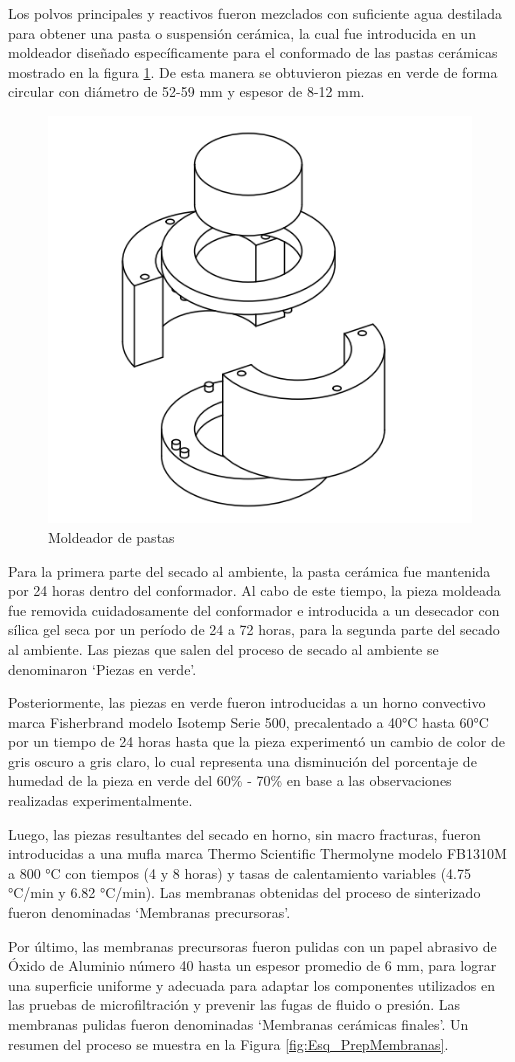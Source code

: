 \documentclass{article}
\begin{document}
Los polvos principales y reactivos fueron mezclados con suficiente 
agua destilada para obtener una pasta o suspensión cerámica, la cual 
fue introducida en un moldeador diseñado específicamente para el 
conformado de las pastas cerámicas mostrado en la 
figura \ref{fig:Moldeador_Pastas}. De esta manera se obtuvieron piezas 
en verde de forma circular con diámetro de 52-59 mm y 
espesor de 8-12 mm. 

\begin{figure}[ht]
    \centering
    \includegraphics[width=0.4\linewidth]{Graphics/Moldeador ZTMY-01.png}
    \caption{Moldeador de pastas}
    \label{fig:Moldeador_Pastas}
\end{figure}

Para la primera parte del secado al ambiente, la pasta cerámica fue 
mantenida por 24 horas dentro del conformador. 
Al cabo de este tiempo, la pieza moldeada fue removida 
cuidadosamente del conformador e introducida a un desecador con 
sílica gel seca por un período de 24 a 72 horas, para la segunda 
parte del secado al ambiente. Las piezas que salen del proceso de 
secado al ambiente se denominaron ‘Piezas en verde’.

Posteriormente, las piezas en verde fueron introducidas a un horno 
convectivo marca Fisherbrand modelo Isotemp Serie 500, 
precalentado a 40°C hasta 60°C por un tiempo de 24 horas hasta 
que la pieza experimentó un cambio de color de gris oscuro a gris 
claro, lo cual representa una disminución del porcentaje de humedad 
de la pieza en verde del 60\% - 70\% en base a las observaciones 
realizadas experimentalmente. 

Luego, las piezas resultantes del secado en horno, 
sin macro fracturas, fueron introducidas a una mufla marca 
Thermo Scientific Thermolyne modelo FB1310M a 800 °C con 
tiempos (4 y 8 horas) y tasas de calentamiento variables 
(4.75 °C/min y 6.82 °C/min). Las membranas obtenidas del proceso de 
sinterizado fueron denominadas ‘Membranas precursoras’.

Por último, las membranas precursoras fueron pulidas con un papel 
abrasivo de Óxido de Aluminio número 40 hasta un espesor promedio 
de 6 mm, para lograr una superficie uniforme y adecuada para adaptar 
los componentes utilizados en las pruebas de microfiltración y 
prevenir las fugas de fluido o presión. Las membranas pulidas fueron 
denominadas ‘Membranas cerámicas finales’. Un resumen del proceso se 
muestra en la Figura \ref{fig:Esq_PrepMembranas}.
\end{document}
